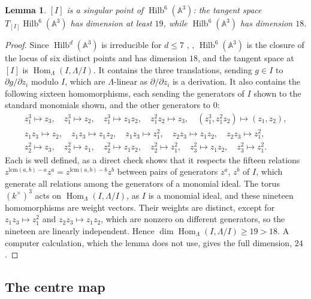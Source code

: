 \documentclass[11pt]{amsart}
\numberwithin{table}{section}
\numberwithin{figure}{section}
\numberwithin{equation}{section}
\newtheorem{lem}[thm]{Lemma}
\theoremstyle{definition}
\theoremstyle{plain}
\newcommand{\A}{\mathbb{A}}
\DeclareMathOperator{\Hom}{Hom}
\DeclareMathOperator{\Hilb}{Hilb}
\begin{document}
\begin{lem}\label{lem:hilbTangent}
$[I]$ is a singular point of $\Hilb^6(\A^3)$: the tangent space $T_{[I]} \Hilb^6(\A^3)$ has dimension at least $19$, while $\Hilb^6(\A^3)$ has dimension $18$.
\end{lem}

\begin{proof}
Since $\Hilb^d(\A^3)$ is irreducible for $d \le 7$ \cite[Cor~4]{Maz}, \cite[\S1]{DJNT}, $\Hilb^6(\A^3)$ is the closure of the locus of six distinct points and has dimension $18$, and the tangent space at $[I]$ is $\Hom_\Lambda(I, \Lambda/I)$. It contains the three translations, sending $g \in I$ to $\partial g/\partial z_i$ modulo $I$, which are $\Lambda$-linear as $\partial/\partial z_i$ is a derivation. It also contains the following sixteen homomorphisms, each sending the generators of $I$ shown to the standard monomials shown, and the other generators to $0$:
\[
\begin{gathered}
z_1^3 \mapsto z_3,\quad z_1^3 \mapsto z_2,\quad z_1^3 \mapsto z_1z_2,\quad z_1^2z_2 \mapsto z_3,\quad (z_1^3, z_1^2z_2) \mapsto (z_1, z_2), \\
z_1z_3 \mapsto z_2,\quad z_1z_3 \mapsto z_1z_2,\quad z_1z_3 \mapsto z_1^2,\quad z_2z_3 \mapsto z_1z_2,\quad z_2z_3 \mapsto z_1^2, \\
z_2^2 \mapsto z_3,\quad z_2^2 \mapsto z_1,\quad z_2^2 \mapsto z_1z_2,\quad z_2^2 \mapsto z_1^2,\quad z_3^2 \mapsto z_1z_2,\quad z_3^2 \mapsto z_1^2.
\end{gathered}
\]
Each is well defined, as a direct check shows that it respects the fifteen relations $z^{\mathrm{lcm}(a, b) - a} z^a = z^{\mathrm{lcm}(a, b) - b} z^b$ between pairs of generators $z^a$, $z^b$ of $I$, which generate all relations among the generators of a monomial ideal. The torus $(k^\times)^3$ acts on $\Hom_\Lambda(I, \Lambda/I)$, as $I$ is a monomial ideal, and these nineteen homomorphisms are weight vectors. Their weights are distinct, except for $z_1z_3 \mapsto z_1^2$ and $z_2z_3 \mapsto z_1z_2$, which are nonzero on different generators, so the nineteen are linearly independent. Hence $\dim \Hom_\Lambda(I, \Lambda/I) \ge 19 > 18$. A computer calculation, which the lemma does not use, gives the full dimension, $24$.
\end{proof}

\subsection{The centre map}\label{ss:centremap}
\end{document}
